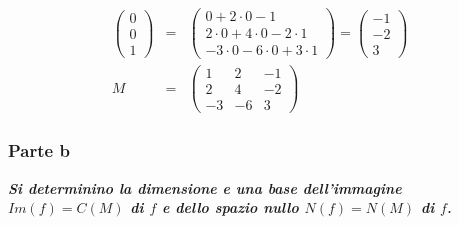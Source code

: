 \documentclass[a4paper]{article}
\begin{document}
\begin{equation*}
\begin{array}{rll}
\begin{pmatrix}
				0 \\ 0 \\ 1
			\end{pmatrix} &=& \begin{pmatrix}
				0 + 2 \cdot 0 - 1 \\
				2 \cdot 0 + 4 \cdot 0 - 2 \cdot 1 \\
				- 3 \cdot 0 - 6 \cdot 0 + 3 \cdot 1
			\end{pmatrix} = \begin{pmatrix}
				-1 \\
				-2 \\
				3
			\end{pmatrix} \\ [2em]
			M &=& \begin{pmatrix}
				1	& 2		& -1 \\
				2	& 4		& -2 \\
				-3	& -6	& 3 
			\end{pmatrix}
		\end{array}
	\end{equation*}\newpage

	\subsubsection{Parte b}

	\textcolor{Green4}{\textbf{\emph{Si determinino la dimensione e una base dell'immagine $Im\left(f\right) = C\left(M\right)$ di $f$ e dello spazio nullo $N\left(f\right) = N\left(M\right)$ di $f$.}}}\newline
\end{document}
